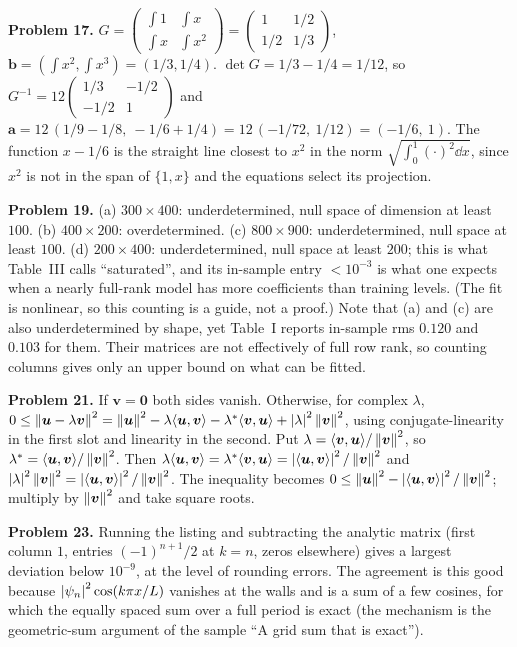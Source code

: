 \textbf{Problem 17.} $G=\begin{pmatrix}\int1&\int x\\ \int x&\int x^2\end{pmatrix}=\begin{pmatrix}1&1/2\\1/2&1/3\end{pmatrix}$, $\bm b=(\int x^2,\int x^3)=(1/3,1/4)$. $\det G=1/3-1/4=1/12$, so $G^{-1}=12\begin{pmatrix}1/3&-1/2\\-1/2&1\end{pmatrix}$ and $\bm a=12\,(1/9-1/8,\ -1/6+1/4)=12\,(-1/72,\ 1/12)=(-1/6,\ 1)$. The function $x-1/6$ is the straight line closest to $x^2$ in the norm $\sqrt{\int_0^1(\cdot)^2\dd x}$, since $x^2$ is not in the span of $\{1,x\}$ and the equations select its projection.

\textbf{Problem 19.} (a) $300\times400$: underdetermined, null space of dimension at least $100$. (b) $400\times200$: overdetermined. (c) $800\times900$: underdetermined, null space at least $100$. (d) $200\times400$: underdetermined, null space at least $200$; this is what Table~III calls ``saturated'', and its in-sample entry $<10^{-3}$ is what one expects when a nearly full-rank model has more coefficients than training levels. (The fit is nonlinear, so this counting is a guide, not a proof.) Note that (a) and (c) are also underdetermined by shape, yet Table~I reports in-sample rms $0.120$ and $0.103$ for them. Their matrices are not effectively of full row rank, so counting columns gives only an upper bound on what can be fitted.

\textbf{Problem 21.} If $\bm v=\bm 0$ both sides vanish. Otherwise, for complex $\lambda$, $0\le\left\lVert \bm u-\lambda\bm v\right\rVert^2=\left\lVert \bm u\right\rVert^2-\lambda\langle\bm u,\bm v\rangle-\lambda^*\langle\bm v,\bm u\rangle+\left\lvert \lambda\right\rvert^2\left\lVert \bm v\right\rVert^2$, using conjugate-linearity in the first slot and linearity in the second. Put $\lambda=\langle\bm v,\bm u\rangle/\left\lVert \bm v\right\rVert^2$, so $\lambda^*=\langle\bm u,\bm v\rangle/\left\lVert \bm v\right\rVert^2$. Then $\lambda\langle\bm u,\bm v\rangle=\lambda^*\langle\bm v,\bm u\rangle=\left\lvert \langle\bm u,\bm v\rangle\right\rvert^2/\left\lVert \bm v\right\rVert^2$ and $\left\lvert \lambda\right\rvert^2\left\lVert \bm v\right\rVert^2=\left\lvert \langle\bm u,\bm v\rangle\right\rvert^2/\left\lVert \bm v\right\rVert^2$. The inequality becomes $0\le\left\lVert \bm u\right\rVert^2-\left\lvert \langle\bm u,\bm v\rangle\right\rvert^2/\left\lVert \bm v\right\rVert^2$; multiply by $\left\lVert \bm v\right\rVert^2$ and take square roots.

\textbf{Problem 23.} Running the listing and subtracting the analytic matrix (first column $1$, entries $(-1)^{n+1}/2$ at $k=n$, zeros elsewhere) gives a largest deviation below $10^{-9}$, at the level of rounding errors. The agreement is this good because $\left\lvert \psi_n\right\rvert^2\cos(k\pi x/L)$ vanishes at the walls and is a sum of a few cosines, for which the equally spaced sum over a full period is exact (the mechanism is the geometric-sum argument of the sample ``A grid sum that is exact'').

